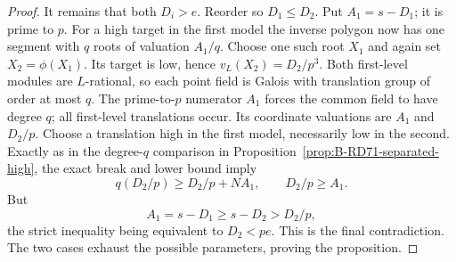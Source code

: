 \begin{proof}
It remains that both \(D_i>e\). Reorder so \(D_1\le D_2\).
Put \(A_1=s-D_1\); it is prime to \(p\).
For a high target in the first model the inverse polygon now
has one segment with \(q\) roots of valuation \(A_1/q\).
Choose one such root \(X_1\) and again set \(X_2=\phi(X_1)\).
Its target is low, hence \(v_L(X_2)=D_2/p^3\).
Both first-level modules are \(L\)-rational, so each point
field is Galois with translation group of order at most \(q\).
The prime-to-\(p\) numerator \(A_1\) forces the common field
to have degree \(q\); all first-level translations occur.
Its coordinate valuations are \(A_1\) and \(D_2/p\).
Choose a translation high in the first model, necessarily low
in the second. Exactly as in the degree-\(q\) comparison in
Proposition~\ref{prop:B-RD71-separated-high}, the exact break
and lower bound imply
\[
 q(D_2/p)\ge D_2/p+N A_1,
 \qquad D_2/p\ge A_1.
 \tag{B-RD73.9}
\]
But
\[
 A_1=s-D_1\ge s-D_2>D_2/p,
\]
the strict inequality being equivalent to \(D_2<pe\).
This is the final contradiction. The two cases exhaust the
possible parameters, proving the proposition.
\end{proof}

